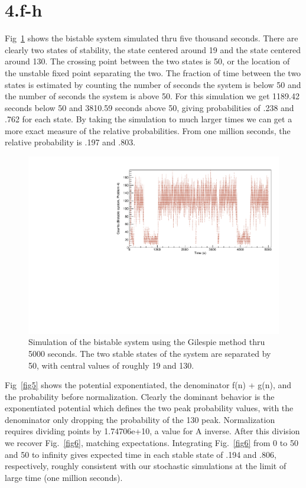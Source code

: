 \documentclass{article}
\begin{document}
\section{4.f-h}

Fig~\ref{fig4} shows the bistable system simulated thru five thousand seconds. There are clearly two states of stability, the state centered around 19 and the state centered around 130. The crossing point between the two states is 50, or the location of the unstable fixed point separating the two. The fraction of time between the two states is estimated by counting the number of seconds the system is below 50 and the number of seconds the system is above 50. For this simulation we get 1189.42 seconds below 50 and 3810.59 seconds above 50, giving probabilities of .238 and .762 for each state. By taking the simulation to much larger times we can get a more exact measure of the relative probabilities. From one million seconds, the relative probability is .197 and .803.


\begin{figure}[H]
    \centering
    \includegraphics[width=.99\textwidth]{canvBistableGil_Final.pdf} 
    \caption{Simulation of the bistable system using the Gilespie method thru 5000 seconds. The two stable states of the system are separated by 50, with central values of roughly 19 and 130.}
    \label{fig4}
\end{figure}

Fig~\ref{fig5} shows the potential exponentiated, the denominator f(n) + g(n), and the probability before normalization. Clearly the dominant behavior is the exponentiated potential which defines the two peak probability values, with the denominator only dropping the probability of the 130 peak. Normalization requires dividing points by 1.74706e+10, a value for A inverse. After this division we recover Fig.~\ref{fig6}, matching expectations. Integrating Fig.~\ref{fig6} from 0 to 50 and 50 to infinity gives expected time in each stable state of .194 and .806, respectively, roughly consistent with our stochastic simulations at the limit of large time (one million seconds).
\end{document}
